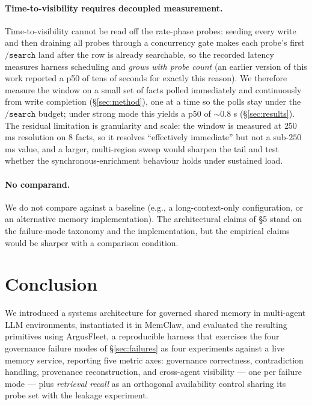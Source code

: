 \documentclass[10pt,twocolumn,letterpaper]{article}
\begin{document}
\paragraph{Time-to-visibility requires decoupled measurement.}
Time-to-visibility cannot be read off the rate-phase probes: seeding every write and then draining all probes through a concurrency gate makes each probe's first \(\mathtt{/search}\) land after the row is already searchable, so the recorded latency measures harness scheduling and \emph{grows with probe count} (an earlier version of this work reported a p50 of tens of seconds for exactly this reason). We therefore measure the window on a small set of facts polled immediately and continuously from write completion (\S\ref{sec:method}), one at a time so the polls stay under the \(\mathtt{/search}\) budget; under strong mode this yields a p50 of \(\sim\!0.8\) s (\S\ref{sec:results}). The residual limitation is granularity and scale: the window is measured at \(250\) ms resolution on \(8\) facts, so it resolves ``effectively immediate'' but not a sub-\(250\) ms value, and a larger, multi-region sweep would sharpen the tail and test whether the synchronous-enrichment behaviour holds under sustained load.

\paragraph{No comparand.}
We do not compare against a baseline (e.g., a long-context-only configuration, or an alternative memory implementation). The architectural claims of \S5 stand on the failure-mode taxonomy and the implementation, but the empirical claims would be sharper with a comparison condition.

\section{Conclusion}

We introduced a systems architecture for governed shared memory in multi-agent LLM environments, instantiated it in MemClaw, and evaluated the resulting primitives using ArgusFleet, a reproducible harness that exercises the four governance failure modes of \S\ref{sec:failures} as four experiments against a live memory service, reporting five metric axes: governance correctness, contradiction handling, provenance reconstruction, and cross-agent visibility --- one per failure mode --- plus \emph{retrieval recall} as an orthogonal availability control sharing its probe set with the leakage experiment.
\end{document}
